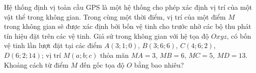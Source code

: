 \begin{ex}%
	Hệ thống định vị toàn cầu GPS là một hệ thống cho phép xác định vị trí của một vật thể trong không gian. Trong cùng một thời điểm, vị trí của một điểm $M$ trong không gian sẽ được xác định bởi bốn vệ tinh cho trước nhờ các bộ thu phát tín hiệu đặt trên các vệ tinh. Giả sử trong không gian với hệ tọa độ $Oxyz$, có bốn vệ tinh lần lượt đặt tại các điểm $A(3;1;0)$, $B(3;6;6)$, $C(4;6;2)$, $D(6;2;14)$; vị trí $M(a;b;c)$ thỏa mãn $MA=3$, $MB=6$, $MC=5$, $MD=13$. Khoảng cách từ điểm $M$ đến gốc tọa độ $O$ bằng bao nhiêu?
	\par{}
\end{ex}

